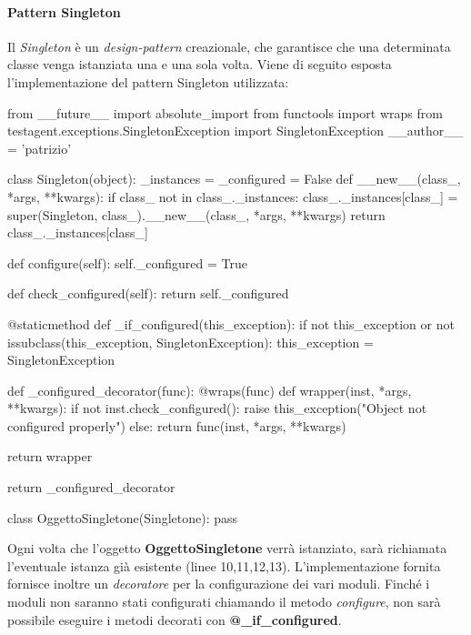 \documentclass[../main.tex]{subfiles}
\begin{document}
\paragraph{Pattern Singleton}
Il \textit{Singleton} è un \textit{design-pattern} creazionale, che garantisce che una determinata classe venga istanziata una e una sola volta.
Viene di seguito esposta l'implementazione del pattern Singleton utilizzata:
\begin{python}
from __future__ import absolute_import
from functools import wraps
from testagent.exceptions.SingletonException import SingletonException
__author__ = 'patrizio'


class Singleton(object):
    _instances = {}
    _configured = False
    def __new__(class_, *args, **kwargs):
        if class_ not in class_._instances:
            class_._instances[class_] = super(Singleton, class_).__new__(class_, *args, **kwargs)
        return class_._instances[class_]

    def configure(self):
        self._configured = True

    def check_configured(self):
        return self._configured

    @staticmethod
    def _if_configured(this_exception):
        if not this_exception or not issubclass(this_exception, SingletonException):
            this_exception = SingletonException

        def _configured_decorator(func):
            @wraps(func)
            def wrapper(inst, *args, **kwargs):
                if not inst.check_configured():
                    raise this_exception("Object not configured properly")
                else:
                    return func(inst, *args, **kwargs)

            return wrapper

        return _configured_decorator
        
class OggettoSingletone(Singletone):
    pass
\end{python}
Ogni volta che l'oggetto \textbf{OggettoSingletone} verrà istanziato, sarà richiamata l'eventuale istanza già esistente (linee 10,11,12,13).
L'implementazione fornita fornisce inoltre un \textit{decoratore} per la configurazione dei vari moduli. Finché i moduli non saranno stati configurati chiamando il metodo \textit{configure}, non sarà possibile eseguire i metodi decorati con \textbf{@\_if\_configured}.
\newpage
\end{document}
